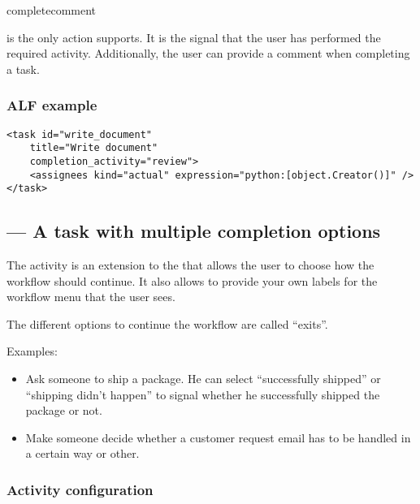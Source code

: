     \begin{funcdesc}{complete}{comment}
        
       is the only action  supports. It is the
      signal that the user has performed the required activity. Additionally,
      the user can provide a comment when completing a task.

    \end{funcdesc}

  \subsubsection{ALF example}

\begin{verbatim}
<task id="write_document"
    title="Write document"
    completion_activity="review">
    <assignees kind="actual" expression="python:[object.Creator()]" />
</task>
\end{verbatim}

  \subsection{ --- A task with multiple completion options}


  The  activity is an extension to the  that allows
  the user to choose how the workflow should continue. It also allows to
  provide your own labels for the workflow menu that the user sees.

  The different options to continue the workflow are called ``exits''.

  Examples:

  \begin{itemize}
      
      \item Ask someone to ship a package. He can select ``successfully
          shipped'' or ``shipping didn't happen'' to signal whether he
          successfully shipped the package or not.

      \item Make someone decide whether a customer request email has to be handled
          in a certain way or other.

  \end{itemize}

  \subsubsection{Activity configuration}

